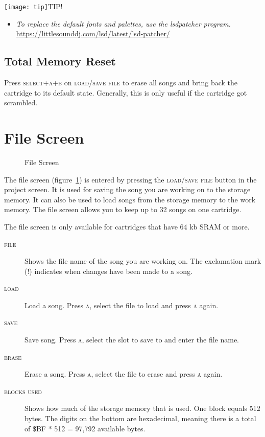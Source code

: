 \texttt{[image: tip]}TIP!
\begin{itemize}
\item \textit{To replace the default fonts and palettes, use the lsdpatcher program.} \url{https://littlesounddj.com/lsd/latest/lsd-patcher/}
\end{itemize}

\subsection{Total Memory Reset}
\label{total-memory-reset}

Press \textsc{select+a+b} on \textsc{load/save file} to erase all songs and bring back the cartridge to its default state.
Generally, this is only useful if the cartridge got scrambled.

\section{File Screen}

\begin{figure}[htpb]
	\begin{center}
	\end{center}
	\caption{File Screen}
	\label{fig:file}
\end{figure}

The file screen (figure~\ref{fig:file}) is entered by pressing the \textsc{load/save file} button in the project screen. It is used for saving the song you are working on to the storage memory. It can also be used to load songs from the storage memory to the work memory. The file screen allows you to keep up to 32 songs on one cartridge.

The file screen is only available for cartridges that have 64 kb SRAM or more.

\begin{description}
	\item[\textsc{file}] Shows the file name of the song you are working on. The exclamation mark (\textsc{!}) indicates when changes have been made to a song.
	\item[\textsc{load}] Load a song. Press \textsc{a}, select the file to load and press \textsc{a} again.
	\item[\textsc{save}] Save song. Press \textsc{a}, select the slot to save to and enter the file name.
	\item[\textsc{erase}] Erase a song. Press \textsc{a}, select the file to erase and press \textsc{a} again.
	\item[\textsc{blocks used}] Shows how much of the storage memory that is used. One block equals 512 bytes. The digits on the bottom are hexadecimal, meaning there is a total of \$BF * 512 = 97,792 available bytes.
\end{description}

